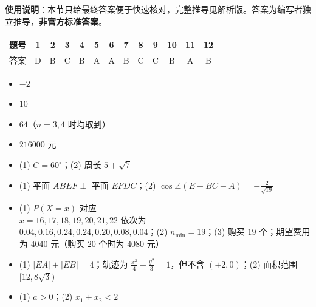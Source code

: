 
\begin{gknotice}
\textbf{使用说明}：本节只给最终答案便于快速核对，完整推导见解析版。答案为编写者独立推导，\textbf{非官方标准答案}。
\end{gknotice}

\begin{center}\begin{tabular}{ccccccccccccc}
\toprule
题号 & 1 & 2 & 3 & 4 & 5 & 6 & 7 & 8 & 9 & 10 & 11 & 12 \\
\midrule
答案 & D & B & C & B & A & A & B & C & C & B & A & B \\
\bottomrule
\end{tabular}\end{center}

\begin{itemize}[leftmargin=2.6em]
  \item[\textbf{13.}] \(-2\)
  \item[\textbf{14.}] \(10\)
  \item[\textbf{15.}] \(64\)（\(n=3,4\) 时均取到）
  \item[\textbf{16.}] \(216000\) 元
\end{itemize}

\begin{itemize}[leftmargin=2.6em]
  \item[\textbf{17.}] (1) \(C=60^\circ\)；(2) 周长 \(5+\sqrt7\)
  \item[\textbf{18.}] (1) 平面 \(ABEF\perp\) 平面 \(EFDC\)；(2) \(\cos\angle(E-BC-A)=-\frac{2}{\sqrt{19}}\)
  \item[\textbf{19.}] (1) \(P(X=x)\) 对应 \\ \(x=16,17,18,19,20,21,22\) 依次为 \\ \(0.04,0.16,0.24,0.24,0.20,0.08,0.04\)；(2) \(n_{\min}=19\)；(3) 购买 \(19\) 个；期望费用为 \(4040\) 元（购买 \(20\) 个时为 \(4080\) 元）
  \item[\textbf{20.}] (1) \(|EA|+|EB|=4\)；轨迹为 \(\frac{x^2}{4}+\frac{y^2}{3}=1\)，但不含 \((\pm2,0)\)；(2) 面积范围 \([12,8\sqrt3)\)
  \item[\textbf{21.}] (1) \(a>0\)；(2) \(x_1+x_2<2\)
\end{itemize}


